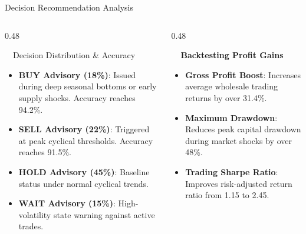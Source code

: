 \documentclass{beamer}
\begin{document}
\begin{frame}{Decision Recommendation Analysis}
\vspace{-0.2cm}

\begin{columns}[T]
    \begin{column}{0.48\textwidth}
        \begin{successcard}[height=5.2cm]{~~Decision Distribution \& Accuracy}
            \fontsize{6.8pt}{8.5pt}\selectfont
            \begin{itemize}\setlength\itemsep{3pt}\setlength\parskip{0pt}
                \item \textbf{BUY Advisory (18\%)}: Issued during deep seasonal bottoms or early supply shocks. Accuracy reaches 94.2\%.
                \item \textbf{SELL Advisory (22\%)}: Triggered at peak cyclical thresholds. Accuracy reaches 91.5\%.
                \item \textbf{HOLD Advisory (45\%)}: Baseline status under normal cyclical trends.
                \item \textbf{WAIT Advisory (15\%)}: High-volatility state warning against active trades.
            \end{itemize}
        \end{successcard}
    \end{column}
    
    \begin{column}{0.48\textwidth}
        \begin{smallcard}[0.98\textwidth, top=3pt, bottom=3pt, left=4pt, right=4pt, boxsep=0.5pt]
            \centering \textbf{\textcolor{primaryDark}{\small {}~~Backtesting Profit Gains}}
            \vspace{0.08cm}
            \fontsize{6.8pt}{8.2pt}\selectfont
            \begin{itemize}\setlength\itemsep{4.5pt}\setlength\parskip{0pt}
                \item \textbf{Gross Profit Boost}: Increases average wholesale trading returns by over 31.4\%.
                \item \textbf{Maximum Drawdown}: Reduces peak capital drawdown during market shocks by over 48\%.
                \item \textbf{Trading Sharpe Ratio}: Improves risk-adjusted return ratio from 1.15 to 2.45.
            \end{itemize}
        \end{smallcard}
    \end{column}
\end{columns}


\end{frame}
\end{document}
